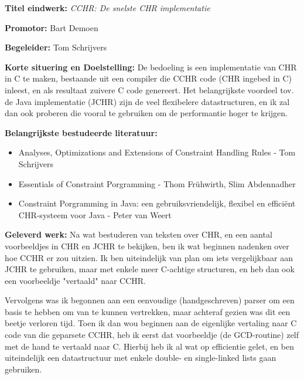 \documentclass[12pt]{report}
\begin{document}
\pagestyle{myheadings}

{\bf Titel eindwerk:} {\em CCHR: De snelste CHR implementatie}

\vspace{0.5cm}
{\bf Promotor:} Bart Demoen


\vspace{0.5cm}
{\bf Begeleider:} Tom Schrijvers

\vspace{1cm}
{\bf Korte situering en Doelstelling: } 
De bedoeling is een implementatie van CHR in C te maken, bestaande uit een compiler die CCHR code (CHR ingebed in C) inleest, en als resultaat zuivere C code genereert. Het belangrijkste voordeel tov. de Java implementatie (JCHR) zijn de veel flexibelere datastructuren, en ik zal dan ook proberen die vooral te gebruiken om de performantie hoger te krijgen.

\vspace{1cm}
{\bf Belangrijkste bestudeerde literatuur:}
\begin{itemize}
\item Analyses, Optimizations and Extensions of Constraint Handling Rules - Tom Schrijvers
\item Essentials of Constraint Porgramming - Thom Fr\"uhwirth, Slim Abdennadher
\item Constraint Porgramming in Java: een gebruiksvriendelijk, flexibel en effici\"ent CHR-systeem voor Java - Peter van Weert
\end{itemize}

\vspace{1cm}
{\bf Geleverd werk:}
Na wat bestuderen van teksten over CHR, en een aantal voorbeeldjes in CHR en JCHR te bekijken, ben ik wat beginnen nadenken over hoe CCHR er zou uitzien. Ik ben uiteindelijk van plan om iets vergelijkbaar aan JCHR te gebruiken, maar met enkele meer C-achtige structuren, en heb dan ook een voorbeeldje "vertaald" naar CCHR.

Vervolgens was ik begonnen aan een eenvoudige (handgeschreven) parser om een basis te hebben om van te kunnen vertrekken, maar achteraf gezien was dit een beetje verloren tijd.
Toen ik dan wou beginnen aan de eigenlijke vertaling naar C code van die geparsete CCHR, heb ik eerst dat voorbeeldje (de GCD-routine) zelf met de hand te vertaald naar C. Hierbij heb ik al wat op efficientie gelet, en ben uiteindelijk een datastructuur met enkele double- en single-linked lists gaan gebruiken. 
\end{document}
